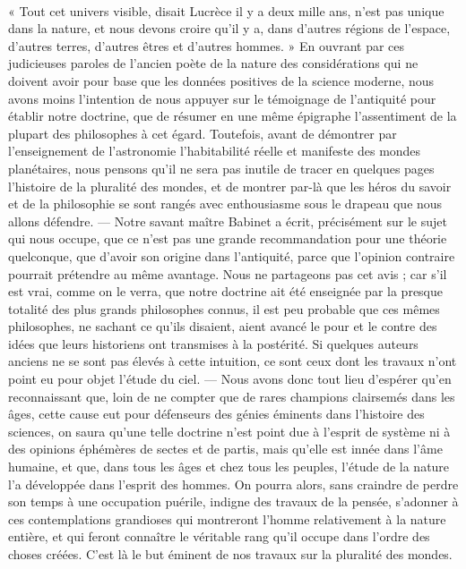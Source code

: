 \documentclass[a4paper, 11pt, oneside]{article}
\begin{document}
\paragraph{}
« Tout cet univers visible, disait Lucrèce il y a deux mille ans, n'est pas unique dans la nature, et nous devons croire qu'il y a, dans d'autres régions de l'espace, d'autres terres, d'autres êtres et d'autres hommes. » En ouvrant par ces judicieuses paroles de l'ancien poète de la nature des considérations qui ne doivent avoir pour base que les données positives de la science moderne, nous avons moins l'intention de nous appuyer sur le témoignage de l'antiquité pour établir notre doctrine, que de résumer en une même épigraphe l'assentiment de la plupart des philosophes à cet égard. Toutefois, avant de démontrer par l'enseignement de l'astronomie l'habitabilité réelle et manifeste des mondes planétaires, nous pensons qu'il ne sera pas inutile de tracer en quelques pages l'histoire de la pluralité des mondes, et de montrer par-là que les héros du savoir et de la philosophie se sont rangés avec enthousiasme sous le drapeau que nous allons défendre. --- Notre savant maître Babinet a écrit, précisément sur le sujet qui nous occupe, que ce n'est pas une grande recommandation pour une théorie quelconque, que d'avoir son origine dans l'antiquité, parce que l'opinion contraire pourrait prétendre au même avantage. Nous ne partageons pas cet avis ; car s'il est vrai, comme on le verra, que notre doctrine ait été enseignée par la presque totalité des plus grands philosophes connus, il est peu probable que ces mêmes philosophes, ne sachant ce qu'ils disaient, aient avancé le pour et le contre des idées que leurs historiens ont transmises à la postérité. Si quelques auteurs anciens ne se sont pas élevés à cette intuition, ce sont ceux dont les travaux n'ont point eu pour objet l'étude du ciel. --- Nous avons donc tout lieu d'espérer qu'en reconnaissant que, loin de ne compter que de rares champions clairsemés dans les âges, cette cause eut pour défenseurs des génies éminents dans l'histoire des sciences, on saura qu'une telle doctrine n'est point due à l'esprit de système ni à des opinions éphémères de sectes et de partis, mais qu'elle est innée dans l'âme humaine, et que, dans tous les âges et chez tous les peuples, l'étude de la nature l'a développée dans l'esprit des hommes. On pourra alors, sans craindre de perdre son temps à une occupation puérile, indigne des travaux de la pensée, s'adonner à ces contemplations grandioses qui montreront l'homme relativement à la nature entière, et qui feront connaître le véritable rang qu'il occupe dans l'ordre des choses créées. C'est là le but éminent de nos travaux sur la pluralité des mondes.
\end{document}
